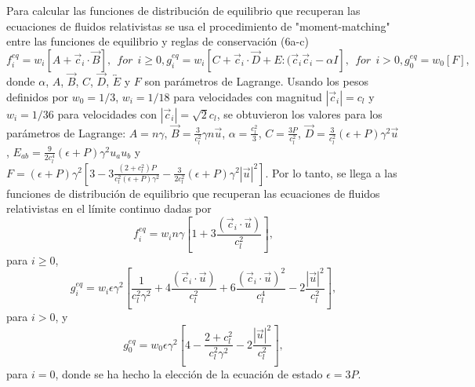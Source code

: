 \documentclass{article}
\begin{document}
Para calcular las funciones de distribución de equilibrio que recuperan las ecuaciones de fluidos relativistas se usa el procedimiento de "moment-matching" entre las funciones de equilibrio y reglas de conservación (6a-c)
\begin{subequations}
\begin{equation}
    f_i^{eq} = w_i [A + \vec{c}_i \cdot \vec{B}], \ \ for \ \ i\geq 0, 
\end{equation}
\begin{equation}
    g_i^{eq} = w_i [C + \vec{c}_i \cdot \vec{D} + E:(\vec{c}_i \vec{c}_i -\alpha I], \ \ for \ \ i > 0, 
\end{equation}
\begin{equation}
g_0^{eq} = w_0 [F], 
\end{equation}
 \end{subequations}
 donde $\alpha$, $A$, $\vec{B}$, $C$, $\vec{D}$, $\overleftrightarrow{E}$ y $F$ son parámetros de Lagrange. Usando los pesos definidos por $w_0=1/3$, $w_i=1/18$ para velocidades con magnitud $|\vec{c}_i|=c_l$ y $w_i = 1/36$ para velocidades con $|\vec{c}_i|=\sqrt{2}c_l$, se obtuvieron los valores para los parámetros de Lagrange: $A=n\gamma$, $\vec{B}= \frac{
 3}{c_l^2}\gamma n \vec{u}$, $\alpha= \frac{c_l^2}{3}$, $C=\frac{3P}{c_l^2}$, $\vec{D}= \frac{3}{c_l^2}(\epsilon+P) \gamma^2 \vec{u}$, $E_{ab}=\frac{9}{2c_l^4}(\epsilon+P) \gamma^2 u_a u_b$ y $F= (\epsilon+P) \gamma^2\left[ 3- 3\frac{(2+c_l^2)P}{c_l^2(\epsilon+P)\gamma^2}- \frac{3}{2c_l^2} (\epsilon+P)\gamma^2|\vec{u}|^2 \right].$ Por lo tanto, se llega a las funciones de distribución de equilibrio que recuperan las ecuaciones de fluidos relativistas en el límite continuo dadas por
   \begin{equation}
     f_i^{eq} = w_i n\gamma\left[ 1+3 \frac{(\vec{c}_i\cdot \vec{u})}{c_l^2} \right], 
 \end{equation}
 para $i\geq 0$, 
 \begin{equation}
     g_i^{eq} = w_i\epsilon\gamma^2\left[ \frac{1}{c_l^2\gamma^2}+4 \frac{(\vec{c}_i\cdot \vec{u})}{c_l^2}+ 6 \frac{(\vec{c}_i\cdot \vec{u})^2}{c_l^4}-2\frac{|\vec{u}|^2}{c_l^2} \right], 
 \end{equation}
  para $i> 0$, y
   \begin{equation}
     g_0^{eq} = w_0\epsilon\gamma^2\left[4- \frac{2+c_l^2}{c_l^2\gamma^2}-2\frac{|\vec{u}|^2}{c_l^2} \right], 
 \end{equation}
 para $i=0$, donde se ha hecho la elección de la ecuación de estado $\epsilon=3P$.\\
 
\end{document}
